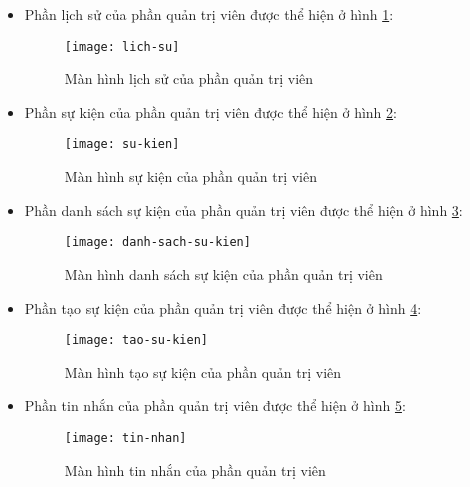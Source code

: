 \documentclass[../Thesis.tex]{subfiles}
\begin{document}
\begin{itemize}
                \item Phần lịch sử của phần quản trị viên được thể hiện ở hình \ref{fig:lich-su}:
                \begin{figure}[hbt!]
                    \centering\texttt{[image: lich-su]}
                    \caption{Màn hình lịch sử của phần quản trị viên}
                    \label{fig:lich-su}
                \end{figure}
                \FloatBarrier

                \item Phần sự kiện của phần quản trị viên được thể hiện ở hình \ref{fig:su-kien}:
                \begin{figure}[hbt!]
                    \centering\texttt{[image: su-kien]}
                    \caption{Màn hình sự kiện của phần quản trị viên}
                    \label{fig:su-kien}
                \end{figure}
                \FloatBarrier

                \item Phần danh sách sự kiện của phần quản trị viên được thể hiện ở hình \ref{fig:danh-sach-su-kien}:
                \begin{figure}[hbt!]
                    \centering\texttt{[image: danh-sach-su-kien]}
                    \caption{Màn hình danh sách sự kiện của phần quản trị viên}
                    \label{fig:danh-sach-su-kien}
                \end{figure}
                \FloatBarrier

                \item Phần tạo sự kiện của phần quản trị viên được thể hiện ở hình \ref{fig:tao-su-kien}:
                \begin{figure}[hbt!]
                    \centering\texttt{[image: tao-su-kien]}
                    \caption{Màn hình tạo sự kiện của phần quản trị viên}
                    \label{fig:tao-su-kien}
                \end{figure}
                \FloatBarrier

                \item Phần tin nhắn của phần quản trị viên được thể hiện ở hình \ref{fig:tin-nhan}:
                \begin{figure}[hbt!]
                    \centering\texttt{[image: tin-nhan]}
                    \caption{Màn hình tin nhắn của phần quản trị viên}
                    \label{fig:tin-nhan}
                \end{figure}
                \FloatBarrier


\end{itemize}
\end{document}

